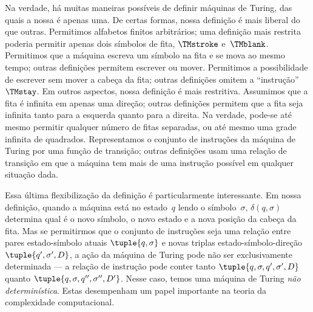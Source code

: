 \documentclass[../../../include/open-logic-section]{subfiles}
\begin{document}

Na verdade, há muitas maneiras possíveis de definir máquinas de Turing, das
quais a nossa é apenas uma.  De certas formas, nossa definição é mais liberal
do que outras. Permitimos alfabetos finitos arbitrários; uma definição mais
restrita poderia permitir apenas dois símbolos de fita, $\TMstroke$
e~$\TMblank$.  Permitimos que a máquina escreva um símbolo na fita
e se mova ao mesmo tempo; outras definições permitem escrever ou
mover.  Permitimos a possibilidade de escrever sem mover a cabeça da fita;
outras definições omitem a ``instrução'' $\TMstay$.  Em outros aspectos,
nossa definição é mais restritiva. Assumimos que a fita é infinita em apenas
uma direção; outras definições permitem que a fita seja infinita tanto para a
esquerda quanto para a direita. Na verdade, pode-se até mesmo permitir
qualquer número de fitas separadas, ou até mesmo uma grade infinita de
quadrados.  Representamos o conjunto de instruções da máquina de Turing por
uma função de transição; outras definições usam uma relação de transição em
que a máquina tem mais de uma instrução possível em qualquer situação dada.

Essa última flexibilização da definição é particularmente interessante.
Em nossa definição, quando a máquina está no estado~$q$ lendo o
símbolo~$\sigma$, $\delta(q, \sigma)$ determina qual é o novo símbolo, o
novo estado e a nova posição da cabeça da fita.  Mas se permitirmos que o
conjunto de instruções seja uma relação entre pares estado-símbolo atuais
$\tuple{q, \sigma}$ e novas triplas estado-símbolo-direção
$\tuple{q', \sigma', D}$, a ação da máquina de Turing pode não ser
exclusivamente determinada --- a relação de instrução pode conter tanto
$\tuple{q, \sigma, q', \sigma', D}$ quanto
$\tuple{q, \sigma, q'', \sigma'', D'}$.
Nesse caso, temos uma máquina de Turing \emph{não determinística}.  Estas
desempenham um papel importante na teoria da complexidade computacional.
\end{document}
